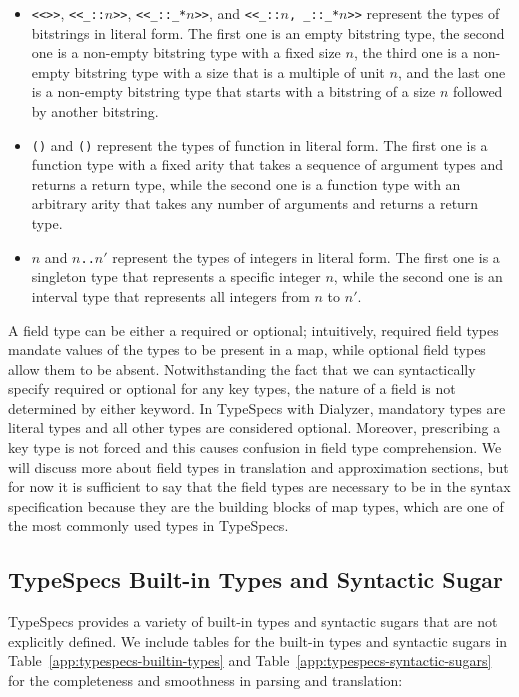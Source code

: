 \begin{itemize}
    \item \texttt{<<>>}, \texttt{<<\_::$n$>>}, \texttt{<<\_::\_*$n$>>}, and \texttt{<<\_::$n$, \_::\_*$n$>>}
    represent the types of bitstrings in literal form.
    The first one is an empty bitstring type, the second one is a non-empty bitstring type with a fixed size $n$, the third one is a non-empty bitstring type with a size that is a multiple of unit $n$, and the last one is a non-empty bitstring type that starts with a bitstring of a size $n$ followed by another bitstring.
    \item \texttt{(\fun{$\ov{\TST}$}{\TST})} and \texttt{(\fun{\dots}{\TST})}
    represent the types of function in literal form.
    The first one is a function type with a fixed arity that takes a sequence of argument types and returns a return type, while the second one is a function type with an arbitrary arity that takes any number of arguments and returns a return type.
    \item \texttt{$n$} and \texttt{$n$..$n'$}
    represent the types of integers in literal form.
    The first one is a singleton type that represents a specific integer $n$, while the second one is an interval type that represents all integers from $n$ to $n'$.
\end{itemize}

A field type can be either a required or optional; intuitively, required field types mandate values of the types to be present in a map, while optional field types allow them to be absent.
Notwithstanding the fact that we can syntactically specify required or optional for any key types, the nature of a field is not determined by either keyword.
In TypeSpecs with Dialyzer, mandatory types are literal types and all other types are considered optional.
Moreover, prescribing a key type is not forced and this causes confusion in field type comprehension.
We will discuss more about field types in translation and approximation sections, but for now it is sufficient to say that the field types are necessary to be in the syntax specification because they are the building blocks of map types, which are one of the most commonly used types in TypeSpecs.

\subsection{TypeSpecs Built-in Types and Syntactic Sugar}

TypeSpecs provides a variety of built-in types and syntactic sugars that are not explicitly defined.
We include tables for the built-in types and syntactic sugars in Table~\ref{app:typespecs-builtin-types} and Table~\ref{app:typespecs-syntactic-sugars} for the completeness and smoothness in parsing and translation:

